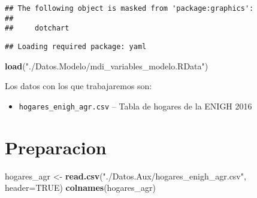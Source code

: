 \documentclass[11pt,]{article}
\newenvironment{Shaded}{\begin{snugshade}}{\end{snugshade}}
\newcommand{\KeywordTok}[1]{\textcolor[rgb]{0.13,0.29,0.53}{\textbf{#1}}}
\newcommand{\DataTypeTok}[1]{\textcolor[rgb]{0.13,0.29,0.53}{#1}}
\newcommand{\StringTok}[1]{\textcolor[rgb]{0.31,0.60,0.02}{#1}}
\newcommand{\OtherTok}[1]{\textcolor[rgb]{0.56,0.35,0.01}{#1}}
\newcommand{\NormalTok}[1]{#1}
\providecommand{\tightlist}{%
\setlength{\itemsep}{0pt}\setlength{\parskip}{0pt}}
\begin{document}
\begin{verbatim}
## The following object is masked from 'package:graphics':
## 
##     dotchart
\end{verbatim}

\begin{verbatim}
## Loading required package: yaml
\end{verbatim}

\begin{Shaded}
\begin{Highlighting}[]
\KeywordTok{load}\NormalTok{(}\StringTok{"./Datos.Modelo/mdi_variables_modelo.RData"}\NormalTok{)}
\end{Highlighting}
\end{Shaded}

Los datos con los que trabajaremos son:

\begin{itemize}
\tightlist
\item
  \texttt{hogares\_enigh\_agr.csv} -- Tabla de hogares de la ENIGH 2016
\end{itemize}

\section{Preparacion}\label{preparacion}

\begin{Shaded}
\begin{Highlighting}[]
\NormalTok{hogares_agr <-}\StringTok{ }\KeywordTok{read.csv}\NormalTok{(}\StringTok{"./Datos.Aux/hogares_enigh_agr.csv"}\NormalTok{, }\DataTypeTok{header=}\OtherTok{TRUE}\NormalTok{)}
\KeywordTok{colnames}\NormalTok{(hogares_agr)}
\end{Highlighting}
\end{Shaded}
\end{document}
